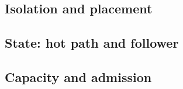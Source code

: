 \subsection{Isolation and placement}

\subsection{State: hot path and follower}

\subsection{Capacity and admission}

